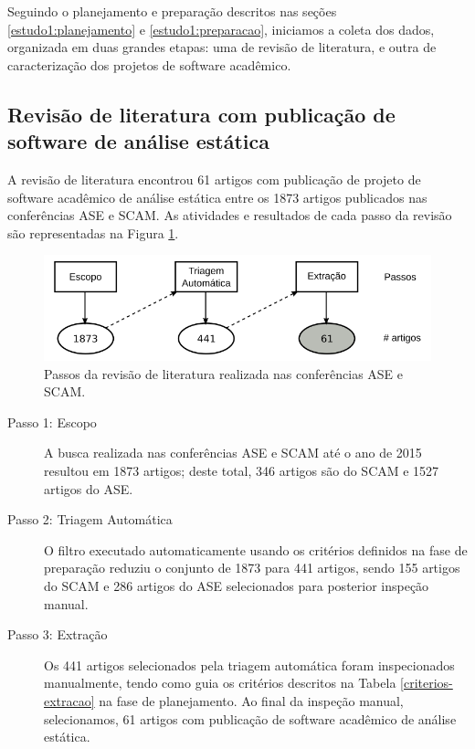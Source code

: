 Seguindo o planejamento e preparação descritos nas seções
\ref{estudo1:planejamento} e \ref{estudo1:preparacao}, iniciamos a coleta dos
dados, organizada em duas grandes etapas: uma de revisão de literatura, e outra
de caracterização dos projetos de software acadêmico.

\subsection{Revisão de literatura com publicação de software de análise estática}

A revisão de literatura encontrou 61 artigos com publicação de projeto de
software acadêmico de análise estática entre os 1873 artigos publicados nas
conferências ASE e SCAM. As atividades e resultados de cada passo da revisão
são representadas na Figura \ref{revisao-literatura}.

\begin{figure}[h]
  \center
  \includegraphics[scale=0.4]{imagens/revisao-literatura.png}
  \caption{Passos da revisão de literatura realizada nas conferências ASE e SCAM.}
  \label{revisao-literatura}
\end{figure}

\begin{description}

  \item [Passo 1: Escopo]

A busca realizada nas conferências ASE e SCAM até o ano de 2015 resultou em
1873 artigos; deste total, 346 artigos são do SCAM e 1527 artigos do ASE.

  \item [Passo 2: Triagem Automática]

O filtro executado automaticamente usando os critérios definidos na fase de
preparação reduziu o conjunto de 1873 para 441 artigos, sendo 155 artigos do SCAM e
286 artigos do ASE selecionados para posterior inspeção manual.

  \item [Passo 3: Extração]

Os 441 artigos selecionados pela triagem automática foram inspecionados manualmente, tendo como guia
os critérios descritos na Tabela \ref{criterios-extracao} na fase de
planejamento. Ao final da inspeção manual, selecionamos, 61 artigos com publicação de
software acadêmico de análise estática.

\end{description}

